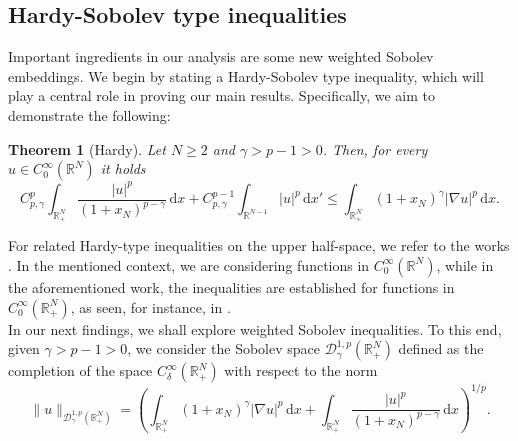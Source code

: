 \documentclass[12pt,reqno]{amsart}
\newtheorem{theorem}{Theorem}[section]
\begin{document}
\subsection{Hardy-Sobolev type inequalities}\label{HS}
Important ingredients in our analysis are some new weighted Sobolev embeddings. We begin by stating a Hardy-Sobolev type inequality, which will play a central role in proving our main results. Specifically, we aim to demonstrate the following:

\begin{theorem}[Hardy]\label{Hardy}
		Let $N\geq2$ and $\gamma>p-1>0$. Then, for every $u \in C^{\infty}_0(\mathds{R}^N)$ it holds
		\begin{equation}\label{hardy with xn}
			 C_{p,\gamma}^p \int_{\mathds{R}_{+}^N}\frac{|u|^p}{(1+x_N)^{p-\gamma}}\, \mathrm{d}  x  + 
			C_{p,\gamma}^{p-1} \int_{\mathds{R}^{N-1}}|u|^p \, \mathrm{d}  x'
   \leq \int_{\mathds{R}_{+}^N}(1+x_N)^\gamma |\nabla u|^p \, \mathrm{d} x .
		\end{equation}		
	\end{theorem}
For related Hardy-type inequalities on the upper half-space, we refer to the works \cite{zbMATH05115299, zbMATH06347299,zbMATH06053053, zbMATH05134242,zbMATH03073200,zbMATH02172983}.  In the mentioned context, we are considering functions in $C_0^\infty(\mathds{R}^N)$,
 while in the aforementioned work, the inequalities are established for functions in $C_0^\infty(\mathds{R}^N_+)$, as seen, for instance, in \cite[Theorem 6.9]{zbMATH06347299}.\\

 
 In our next findings, we shall explore weighted Sobolev inequalities. To this end, given  $\gamma >p-1>0$, we consider the Sobolev space  $\mathcal{D}_\gamma^{1, p}(\mathds{R}^N_+)$ defined as the completion of the space $C_\delta^\infty(\mathds{R}^N_+)$ with respect to the norm  
	$$
	\|u\|_{\mathcal{D}_\gamma^{1, p}(\mathds{R}^N_+)}=\left(\int_{\mathds{R}_+^N}(1+x_N)^{\gamma}|\nabla u|^p\, \mathrm{d} x+\int_{\mathds{R}^N_+}\frac{|u|^p}{(1+x_N)^{p-\gamma}}\, \mathrm{d} x\right)^{1/p}.
	$$
\end{document}
